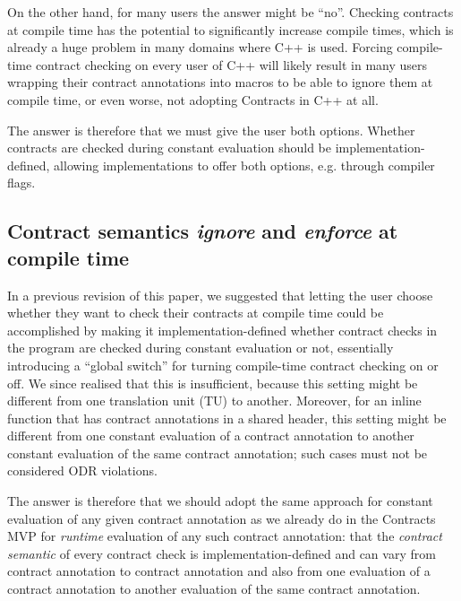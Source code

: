 On the other hand, for many users the answer might be ``no''. Checking contracts at compile time has the potential to significantly increase compile times, which is already a huge problem in many domains where C++ is used. Forcing compile-time contract checking on every user of C++ will likely result in many users wrapping their contract annotations into macros to be able to ignore them at compile time, or even worse, not adopting Contracts in C++ at all.

The answer is therefore that we must give the user both options. Whether contracts are checked during constant evaluation should be implementation-defined, allowing implementations to offer both options, e.g. through compiler flags.

\subsection{Contract semantics \emph{ignore} and \emph{enforce} at compile time}

In a previous revision of this paper, we suggested that letting the user choose whether they want to check their contracts at compile time could be accomplished by making it implementation-defined whether contract checks in the program are checked during constant evaluation or not, essentially introducing a ``global switch'' for turning compile-time contract checking on or off. We since realised that this is insufficient, because this setting might be different from one translation unit (TU) to another. Moreover, for an inline function that has contract annotations in a shared header, this setting might be different from one constant evaluation of a contract annotation to another constant evaluation of the same contract annotation; such cases must not be considered ODR violations.

The answer is therefore that we should adopt the same approach for constant evaluation of any given contract annotation as we already do in the Contracts MVP \cite{P2900R3} for \emph{runtime} evaluation of any such contract annotation: that the \emph{contract semantic} of every contract check is implementation-defined and can vary from contract annotation to contract annotation and also from one evaluation of a contract annotation to another evaluation of the same contract annotation.

